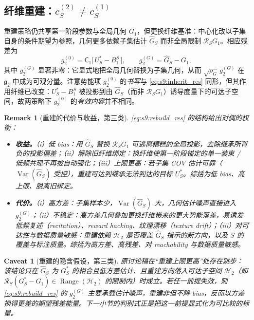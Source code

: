 \documentclass[11pt,a4paper]{article}
\newtheorem{remark}[theorem]{Remark}
\newtheorem{caveat}[theorem]{Caveat}
\DeclareMathOperator{\Var}{Var}
\newcommand{\cH}{\mathcal{H}}   %
\newcommand{\Rstr}{\mathcal{R}}     %
\newcommand{\Center}{\mathsf{C}}    %
\newcommand{\gres}{\bm{\mathfrak{g}}} %
\newcommand{\Range}{\operatorname{Range}}
\begin{document}
\subsection{纤维重建：$c_S^{(2)}\neq c_S^{(1)}$}

重建策略仍共享第一阶段参数与全局几何 $G_1$，但更换纤维基准：中心化改以子集自身的条件期望为参照，几何更多依赖子集估计 $\widehat G_S$ 而非全局限制 $\Rstr_S G_1$。相应残差为
\begin{equation}\label{eq:s9:rebuild_res}
g_2^{(0)}=\Center_1\!\big[\,U_S^*-B_1^S\,\big],
\qquad
g_2^{(G)}=\widehat G_S-G_1 ,
\end{equation}
其中 $g_2^{(G)}$ 显著非零：它显式地把全局几何替换为子集几何，从而 $\sqrt{\rho_G}\,g_2^{(G)}$ 在 $\gres_2$ 中成为可观分量。注意势能项 $g_2^{(0)}$ 的\emph{书写}与 \eqref{eq:s9:inherit_res} 同形，但其作用纤维已改变：$U_S^*-B_1^S$ 被投影到由 $\widehat G_S$（而非 $\Rstr_S G_1$）诱导度量下的可达子空间，故两策略下 $g_2^{(0)}$ 的\emph{有效内容}并不相同。

\begin{remark}[重建的代价与收益，第三类]\label{rem:s9:rebuild}
\eqref{eq:s9:rebuild_res} 的结构给出对偶的权衡：
\begin{itemize}
\item \textbf{收益。}（i）\emph{低 bias}：用 $\widehat G_S$ 替换 $\Rstr_S G_1$ 可\emph{逃离糟糕的全局投影}，去除继承所背负的投影偏差；（ii）\emph{解除旧纤维绑定}：换纤维使第一阶段锚定的单一装束 / 低频共现不再被自动强化；（iii）\emph{上限更高}：若子集 COV 估计可靠（$\Var(\widehat G_S)$ 受控），重建可达到继承无法到达的目标 $U_S^*$。综括为\emph{低 bias、高上限、脱离旧绑定}。
\item \textbf{代价。}（i）\emph{高方差}：子集样本少，$\Var(\widehat G_S)$ 大，几何估计噪声直接进入 $g_2^{(G)}$；（ii）\emph{不稳定}：高方差几何叠加更换纤维带来的更大势能落差，易诱发\emph{低频复述（recitation）、reward hacking、纹理漂移（texture drift）}；（iii）\emph{对可达性与数据质量敏感}：重建依赖 $\cH_2$ 是否覆盖 $\widehat G_S$ 指示的新方向，以及 $S$ 的覆盖与标注质量。综括为\emph{高方差、高残差、对 reachability 与数据质量敏感}。
\end{itemize}
\end{remark}

\begin{caveat}[重建的隐含假设，第三类]\label{cav:s9:rebuild_assume}
原讨论稿在“重建上限更高”处存在跳步：该结论只在 $\widehat G_S$ 为 $G_S^*$ 的\emph{相合且低方差}估计、且重建方向落入可达子空间 $\cH_2$（即 $\Rstr_S(G_S^*-G_1)\in\Range(\cH_2)$ 的限制内）时成立。若任一前提失效，则 \eqref{eq:s9:rebuild_res} 的 $g_2^{(G)}$ 主要承载估计噪声，重建非但不降 bias，反而以方差换得更差的期望残差能量。下一小节的判别式正是把这一前提显式化为可比较的标量。
\end{caveat}
\end{document}
